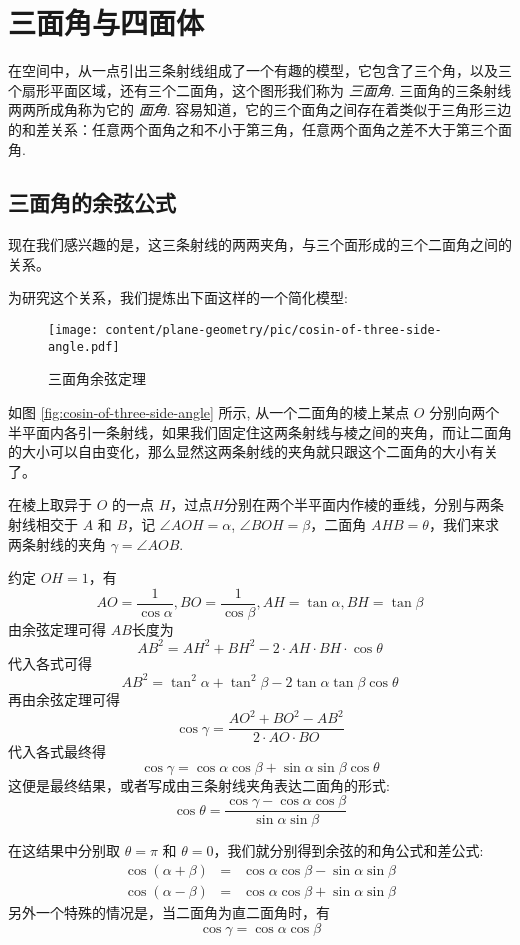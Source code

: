 
\section{三面角与四面体}
\label{sec:trihedral-angle}

在空间中，从一点引出三条射线组成了一个有趣的模型，它包含了三个角，以及三个扇形平面区域，还有三个二面角，这个图形我们称为 \emph{三面角}. 三面角的三条射线两两所成角称为它的 \emph{面角}. 容易知道，它的三个面角之间存在着类似于三角形三边的和差关系：任意两个面角之和不小于第三角，任意两个面角之差不大于第三个面角.


\subsection{三面角的余弦公式}
\label{sec:cosin-of-three-side-angle}


现在我们感兴趣的是，这三条射线的两两夹角，与三个面形成的三个二面角之间的关系。

为研究这个关系，我们提炼出下面这样的一个简化模型:


\begin{figure}[htbp]
\centering
\texttt{[image: content/plane-geometry/pic/cosin-of-three-side-angle.pdf]}
\caption{三面角余弦定理}
\label{fig:cosin-of-three-side-angle}
\end{figure}

如图 \autoref{fig:cosin-of-three-side-angle} 所示, 从一个二面角的棱上某点 $O$ 分别向两个半平面内各引一条射线，如果我们固定住这两条射线与棱之间的夹角，而让二面角的大小可以自由变化，那么显然这两条射线的夹角就只跟这个二面角的大小有关了。

在棱上取异于 $O$ 的一点 $H$，过点$H$分别在两个半平面内作棱的垂线，分别与两条射线相交于 $A$ 和 $B$，记 $\angle AOH = \alpha$, $\angle BOH=\beta$，二面角 $AHB=\theta$，我们来求 两条射线的夹角 $\gamma = \angle AOB$.

约定 $OH = 1$，有
\[ AO = \frac{1}{\cos{\alpha}}, BO = \frac{1}{\cos{\beta}}, AH = \tan{\alpha}, BH = \tan{\beta} \]
由余弦定理可得 $AB$长度为
\[ AB^{2} = AH^2+BH^2-2 \cdot AH \cdot BH \cdot \cos{\theta} \]
代入各式可得
\[ AB^2 = \tan^2{\alpha} + \tan^2{\beta} - 2 \tan{\alpha} \tan{\beta} \cos{\theta} \]
再由余弦定理可得
\[ \cos{\gamma} = \frac{AO^2+BO^2-AB^2}{2 \cdot AO \cdot BO} \]
代入各式最终得
\[ \cos{\gamma} = \cos{\alpha}\cos{\beta}+\sin{\alpha}\sin{\beta}\cos{\theta} \]
这便是最终结果，或者写成由三条射线夹角表达二面角的形式:
\[ \cos{\theta} = \frac{\cos{\gamma}-\cos{\alpha}\cos{\beta}}{\sin{\alpha}\sin{\beta}} \]

在这结果中分别取 $\theta = \pi$ 和 $\theta = 0$，我们就分别得到余弦的和角公式和差公式:
\begin{eqnarray*}
  \cos{(\alpha+\beta)} & = & \cos{\alpha}\cos{\beta} - \sin{\alpha}\sin{\beta} \\
  \cos{(\alpha-\beta)} & = & \cos{\alpha}\cos{\beta} + \sin{\alpha}\sin{\beta} 
\end{eqnarray*}
另外一个特殊的情况是，当二面角为直二面角时，有
\[ \cos{\gamma} = \cos{\alpha}\cos{\beta} \]

